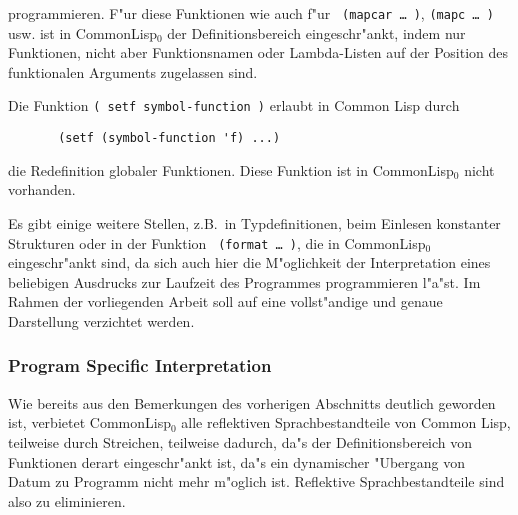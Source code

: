 programmieren. F"ur diese Funktionen wie auch f"ur {\tt
(mapcar\,\ldots\,)}, {\tt (mapc\,\ldots\,)} usw. ist in CommonLisp$_0$
der Definitionsbereich eingeschr"ankt, indem nur Funktionen, nicht
aber Funktionsnamen oder Lambda-Listen auf der Position des
funktionalen Arguments zugelassen sind.

Die Funktion {\tt (\,setf symbol-function\,)} erlaubt in Common Lisp
durch

\begin{verbatim}
       (setf (symbol-function 'f) ...)
\end{verbatim}

die Redefinition globaler Funktionen. Diese Funktion ist in
CommonLisp$_0$ nicht vorhanden.

Es gibt einige weitere Stellen, z.B.\ in Typdefinitionen, beim
Einlesen konstanter Strukturen oder in der Funktion {\tt
(format\,\ldots\,)}, die in CommonLisp$_0$ eingeschr"ankt sind, da
sich auch hier die M"oglichkeit der Interpretation eines beliebigen
Ausdrucks zur Laufzeit des Programmes programmieren l"a"st. Im Rahmen
der vorliegenden Arbeit soll auf eine vollst"andige und genaue
Darstellung verzichtet werden.

\subsubsection*{Program Specific Interpretation}
\label{progeval}

Wie bereits aus den Bemerkungen des vorherigen Abschnitts deutlich
geworden ist, verbietet CommonLisp$_0$ alle reflektiven
Sprachbestandteile von Common Lisp, teilweise durch Streichen,
teilweise dadurch, da"s der Definitionsbereich von Funktionen derart
eingeschr"ankt ist, da"s ein dynamischer "Ubergang von Datum zu
Programm nicht mehr m"oglich ist. Reflektive Sprachbestandteile sind
also zu eliminieren.



